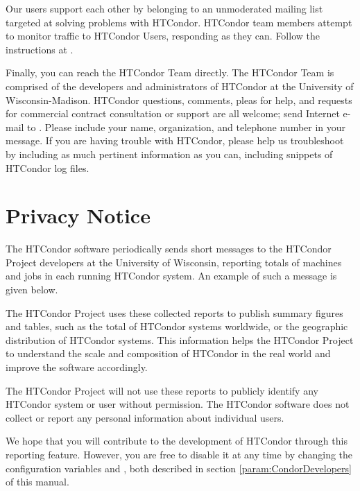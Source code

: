 Our users support each other by belonging to an unmoderated mailing
list targeted at solving problems with HTCondor.
HTCondor team members attempt to monitor traffic to HTCondor Users,
responding as they can. 
Follow the instructions at
.

Finally, you can reach the HTCondor Team directly.
The HTCondor Team is comprised of the 
developers and administrators of HTCondor at the University of Wisconsin-Madison.
HTCondor questions, comments, pleas for help,
and requests for commercial contract consultation or support 
are all welcome;
send Internet e-mail to
.
Please include your name, organization, and telephone number in your message.
If you are having trouble with HTCondor,
please help us troubleshoot by including as much pertinent information
as you can, including snippets of HTCondor log files. 

\section{\label{privacy}Privacy Notice}

%
%

The HTCondor software periodically sends short messages
to the HTCondor Project developers at the University of Wisconsin,
reporting totals of machines and jobs in each running HTCondor system.
An example of such a message is given below.

The HTCondor Project uses these collected reports to publish
summary figures and tables, such as the total of HTCondor systems
worldwide, or the geographic distribution of HTCondor systems.
This information helps the HTCondor Project to understand
the scale and composition of HTCondor in the real world
and improve the software accordingly.

The HTCondor Project will not use these reports to publicly
identify any HTCondor system or user without permission.
The HTCondor software does not collect or report any personal
information about individual users.

We hope that you will contribute to the development of HTCondor
through this reporting feature.
However, you are free to disable it at any time by
changing the configuration variables 
and ,
both described in section \ref{param:CondorDevelopers} of this manual.

